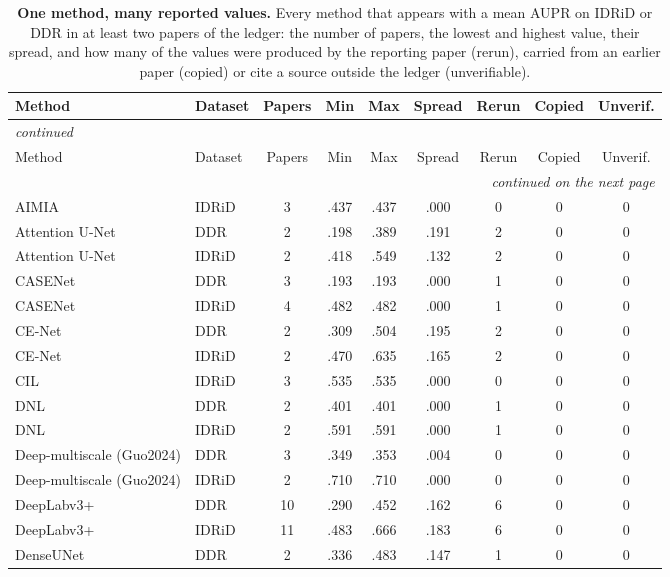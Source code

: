 
{\scriptsize\setlength{\tabcolsep}{3.2pt}\setlength{\LTcapwidth}{\textwidth}\renewcommand{\arraystretch}{1.08}
\begin{longtable}{l l c c c c c c c}
\caption{\textbf{One method, many reported values.} Every method that appears with a mean AUPR on IDRiD or DDR in at least two papers of the ledger: the number of papers, the lowest and highest value, their spread, and how many of the values were produced by the reporting paper (rerun), carried from an earlier paper (copied) or cite a source outside the ledger (unverifiable).}\label{stab:reported}\\
\toprule
Method & Dataset & Papers & Min & Max & Spread & Rerun & Copied & Unverif. \\
\midrule
\endfirsthead
\multicolumn{9}{l}{\textit{continued}}\\
\toprule
Method & Dataset & Papers & Min & Max & Spread & Rerun & Copied & Unverif. \\
\midrule
\endhead
\midrule
\multicolumn{9}{r}{\textit{continued on the next page}}\\
\endfoot
\bottomrule
\endlastfoot
AIMIA & IDRiD & 3 & .437 & .437 & .000 & 0 & 0 & 0 \\
Attention U-Net & DDR & 2 & .198 & .389 & .191 & 2 & 0 & 0 \\
Attention U-Net & IDRiD & 2 & .418 & .549 & .132 & 2 & 0 & 0 \\
CASENet & DDR & 3 & .193 & .193 & .000 & 1 & 0 & 0 \\
CASENet & IDRiD & 4 & .482 & .482 & .000 & 1 & 0 & 0 \\
CE-Net & DDR & 2 & .309 & .504 & .195 & 2 & 0 & 0 \\
CE-Net & IDRiD & 2 & .470 & .635 & .165 & 2 & 0 & 0 \\
CIL & IDRiD & 3 & .535 & .535 & .000 & 0 & 0 & 0 \\
DNL & DDR & 2 & .401 & .401 & .000 & 1 & 0 & 0 \\
DNL & IDRiD & 2 & .591 & .591 & .000 & 1 & 0 & 0 \\
Deep-multiscale (Guo2024) & DDR & 3 & .349 & .353 & .004 & 0 & 0 & 0 \\
Deep-multiscale (Guo2024) & IDRiD & 2 & .710 & .710 & .000 & 0 & 0 & 0 \\
DeepLabv3+ & DDR & 10 & .290 & .452 & .162 & 6 & 0 & 0 \\
DeepLabv3+ & IDRiD & 11 & .483 & .666 & .183 & 6 & 0 & 0 \\
DenseUNet & DDR & 2 & .336 & .483 & .147 & 1 & 0 & 0 \\

\end{longtable}}
